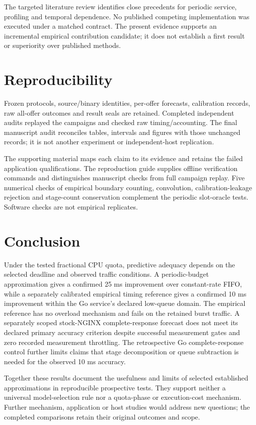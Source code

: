 \documentclass[11pt,a4paper]{article}
\begin{document}
The targeted literature review identifies close precedents for periodic service,
profiling and temporal dependence. No published competing implementation was
executed under a matched contract. The present evidence supports an incremental
empirical contribution candidate; it does not establish a first result or
superiority over published methods.

\section{Reproducibility}

Frozen protocols, source/binary identities, per-offer forecasts, calibration
records, raw all-offer outcomes and result seals are retained. Completed
independent audits replayed the campaigns and checked raw timing/accounting.
The final manuscript audit reconciles tables, intervals and figures with those
unchanged records; it is not another experiment or independent-host replication.

The supporting material maps each
claim to its evidence and retains the failed application qualifications. The
reproduction guide supplies offline
verification commands and distinguishes manuscript checks from full campaign
replay. Five numerical checks of empirical boundary counting, convolution,
calibration-leakage rejection and stage-count conservation complement the
periodic slot-oracle tests. Software checks are not empirical replicates.

\section{Conclusion}

Under the tested fractional CPU quota, predictive adequacy depends on the
selected deadline and observed traffic conditions. A periodic-budget
approximation gives a confirmed 25 ms improvement over constant-rate FIFO,
while a separately calibrated empirical timing reference gives a confirmed
10 ms improvement within the Go service's declared low-queue domain. The
empirical reference has no overload mechanism and fails on the retained burst
traffic. A separately scoped stock-NGINX complete-response forecast does not
meet its declared primary accuracy criterion despite successful measurement
gates and zero recorded measurement throttling. The retrospective Go
complete-response control further limits claims that stage decomposition or
queue subtraction is needed for the observed 10 ms accuracy.

Together these results document the usefulness and limits of selected
established approximations in reproducible prospective tests. They support
neither a universal model-selection rule nor a quota-phase or execution-cost
mechanism. Further mechanism, application or host studies would address new
questions; the completed comparisons retain their original outcomes and scope.
\end{document}
